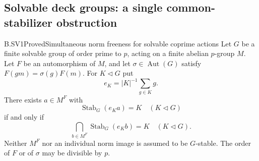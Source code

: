 \subsection{Solvable deck groups: a single common-stabilizer obstruction}

\begin{claim}{B.SV1}{Proved}{Simultaneous norm freeness for solvable coprime actions}
Let $G$ be a finite solvable group of order prime to $p$, acting
on a finite abelian $p$-group $M$. Let $F$ be an automorphism
of $M$, and let $\sigma\in\operatorname{Aut}(G)$ satisfy
$F(gm)=\sigma(g)F(m)$. For $K\triangleleft G$ put
\[
                       e_K=|K|^{-1}\sum_{g\in K}g.
\]
There exists $a\in M^F$ with
\[
                 \operatorname{Stab}_G(e_Ka)=K
                      \quad(K\triangleleft G)                 \tag{B.SV.1}
\]
if and only if
\[
        \bigcap_{b\in M^F}\operatorname{Stab}_G(e_Kb)=K
                      \quad(K\triangleleft G).                \tag{B.SV.2}
\]
Neither $M^F$ nor an individual norm image is assumed to be
$G$-stable. The order of $F$ or of $\sigma$ may be divisible
by $p$.
\end{claim}
